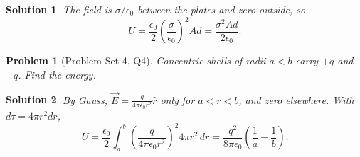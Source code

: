 \documentclass{article}
\newtheorem{problem}{Problem}
\newtheorem{solution}{Solution}
\begin{document}
\begin{solution}
    The field is $\sigma/\epsilon_0$ between the plates and zero outside, so
    \[U = \frac{\epsilon_0}{2}\left(\frac{\sigma}{\epsilon_0}\right)^2 Ad = \frac{\sigma^2 Ad}{2\epsilon_0}.\]
\end{solution}
\begin{problem}[Problem Set 4, Q4]
    Concentric shells of radii $a < b$ carry $+q$ and $-q$. Find the energy.
\end{problem}
\begin{solution}
    By Gauss, $\vec{E} = \frac{q}{4\pi\epsilon_0 r^2}\hat{r}$ only for $a < r < b$, and zero elsewhere. With $d\tau = 4\pi r^2dr$,
    \[U = \frac{\epsilon_0}{2}\int_a^b\left(\frac{q}{4\pi\epsilon_0 r^2}\right)^2 4\pi r^2\,dr = \frac{q^2}{8\pi\epsilon_0}\left(\frac{1}{a} - \frac{1}{b}\right).\]
\end{solution}
\end{document}
